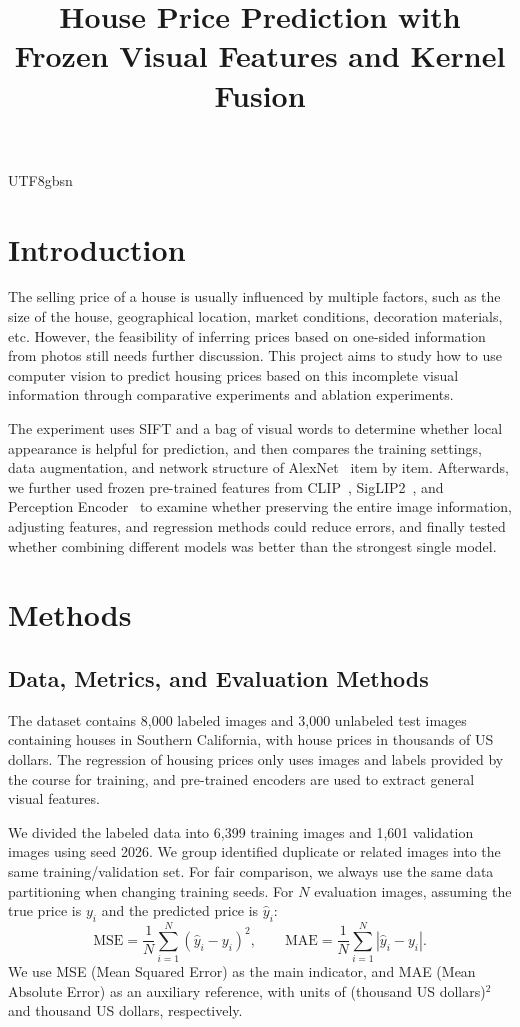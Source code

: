 \documentclass[conference,a4paper]{IEEEtran}
\title{House Price Prediction with Frozen Visual Features and Kernel Fusion}
\author{\IEEEauthorblockN{Shifeng Chen \qquad Haoxuan Ying}
\IEEEauthorblockA{1686631 \qquad 1255329\\
COMP90086 Computer Vision, The University of Melbourne}}
\begin{document}
\ifPDFTeX
\begin{CJK*}{UTF8}{gbsn}
\fi
\maketitle
\raggedbottom

\section{Introduction}
The selling price of a house is usually influenced by multiple factors, such as the size of the house, geographical location, market conditions, decoration materials, etc. However, the feasibility of inferring prices based on one-sided information from photos still needs further discussion. This project aims to study how to use computer vision to predict housing prices based on this incomplete visual information through comparative experiments and ablation experiments.

The experiment uses SIFT and a bag of visual words to determine whether local appearance is helpful for prediction, and then compares the training settings, data augmentation, and network structure of AlexNet~\cite{alexnet} item by item. Afterwards, we further used frozen pre-trained features from CLIP~\cite{clip}, SigLIP2~\cite{siglip2}, and Perception Encoder~\cite{pe} to examine whether preserving the entire image information, adjusting features, and regression methods could reduce errors, and finally tested whether combining different models was better than the strongest single model.

\section{Methods}
\subsection{Data, Metrics, and Evaluation Methods}
The dataset contains 8,000 labeled images and 3,000 unlabeled test images containing houses in Southern California, with house prices in thousands of US dollars. The regression of housing prices only uses images and labels provided by the course for training, and pre-trained encoders are used to extract general visual features.

We divided the labeled data into 6,399 training images and 1,601 validation images using seed 2026. We group identified duplicate or related images into the same training/validation set. For fair comparison, we always use the same data partitioning when changing training seeds. For $N$ evaluation images, assuming the true price is $y_i$ and the predicted price is $\hat y_i$:
\begin{equation}
\mathrm{MSE}=\frac{1}{N}\sum_{i=1}^{N}(\hat y_i-y_i)^2,\qquad
\mathrm{MAE}=\frac{1}{N}\sum_{i=1}^{N}|\hat y_i-y_i|.
\end{equation}
We use MSE (Mean Squared Error) as the main indicator, and MAE (Mean Absolute Error) as an auxiliary reference, with units of (thousand US dollars)$^2$ and thousand US dollars, respectively.


\end{CJK*}
\end{document}
